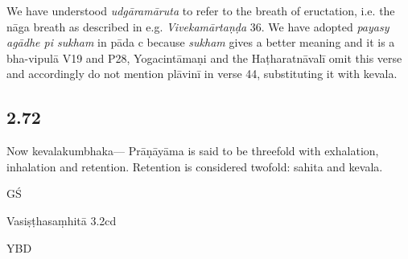 \begin{ekdosis}
\begin{philcomm}[hp02_071]
We have understood \emph{udgāramāruta} to refer to the breath of eructation, i.e. the nāga breath as described in e.g. \emph{Vivekamārtaṇḍa} 36.
We have adopted \emph{payasy agādhe pi sukham} in pāda c because \emph{sukham} gives a better meaning and it is a bha-vipulā
 V19 and P28, Yogacintāmaṇi and the Haṭharatnāvalī omit this verse and accordingly do not mention plāvinī in verse 44, substituting it with kevala.
\end{philcomm}

\subsection*{2.72}
\begin{translation}[hp02_072]
Now kevalakumbhaka---
Prāṇāyāma is said to be threefold with exhalation, inhalation and retention. Retention is considered twofold: sahita and kevala.

\end{translation}

\begin{sources}[hp02_072]
GŚ

\begin{versinnote}
\end{versinnote}

Vasiṣṭhasaṃhitā 3.2cd

\begin{versinnote}
\end{versinnote}
\end{sources}

\begin{testimonia}[hp02_072]
YBD

\begin{versinnote}
\end{versinnote}
\end{testimonia}

\begin{philcomm}[hp02_072]
\end{philcomm}


\end{ekdosis}
